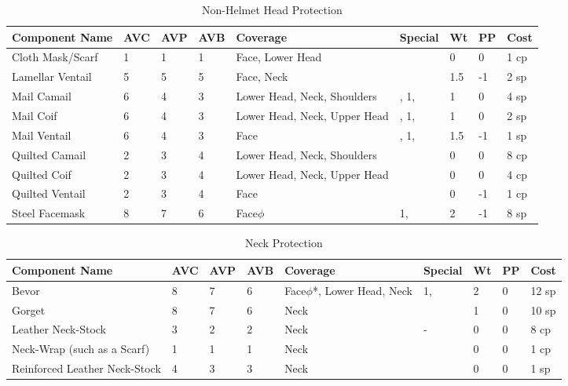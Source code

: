 \documentclass[oneside,11pt,english]{book}
\begin{document}
\begin{longtabu} to 
	\caption{Non-Helmet Head Protection}
	\label{tab:Non-Helmet Head Protection}\\
Component Name&AVC&AVP&AVB& Coverage& Special& Wt&PP&Cost\\\toprule
Cloth Mask/Scarf& 1& 1& 1& Face, Lower Head &&0&0&1 cp\\
Lamellar Ventail& 5& 5& 5& Face, Neck & &1.5 &-1 &2 sp\\
Mail Camail& 6& 4& 3& Lower Head, Neck, Shoulders &,  1, & 1& 0& 4 sp\\
Mail Coif& 6& 4& 3& Lower Head, Neck, Upper Head& ,  1, & 1& 0& 2 sp\\
Mail Ventail& 6& 4& 3& Face& ,  1, & 1.5 &-1& 1 sp\\
Quilted Camail& 2& 3& 4& Lower Head, Neck, Shoulders& & 0& 0& 8 cp\\
Quilted Coif& 2& 3& 4& Lower Head, Neck, Upper Head& & 0& 0& 4 cp\\
Quilted Ventail& 2& 3& 4& Face& & 0 &-1& 1 cp\\
Steel Facemask& 8& 7& 6& Face\hyperref[sec:Weak Spots]{$\phi$}&  1, & 2 &-1& 8 sp\\
\end{longtabu}

\begin{longtabu} to 
	\caption{Neck Protection}
	\label{tab:Neck Protection}\\
Component Name&AVC&AVP&AVB& Coverage& Special& Wt&PP& Cost\\\toprule
Bevor& 8& 7& 6& Face\hyperref[sec:Weak Spots]{$\phi$}*, Lower Head, Neck&  1, & 2& 0& 12 sp\\
Gorget& 8& 7& 6& Neck& & 1& 0& 10 sp\\
Leather Neck-Stock& 3& 2& 2& Neck &-& 0& 0& 8 cp\\
Neck-Wrap (such as a Scarf)& 1& 1& 1& Neck& & 0& 0& 1 cp\\
Reinforced Leather Neck-Stock& 4& 3& 3& Neck& & 0& 0& 1 sp\\
\end{longtabu}
\end{document}
